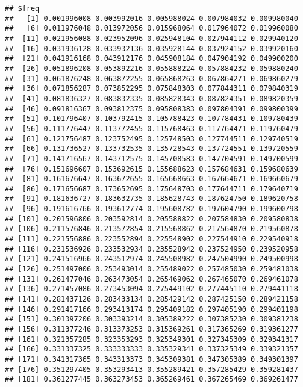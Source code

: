 \documentclass[]{article}
\begin{document}
\begin{verbatim}
## $freq
##   [1] 0.001996008 0.003992016 0.005988024 0.007984032 0.009980040
##   [6] 0.011976048 0.013972056 0.015968064 0.017964072 0.019960080
##  [11] 0.021956088 0.023952096 0.025948104 0.027944112 0.029940120
##  [16] 0.031936128 0.033932136 0.035928144 0.037924152 0.039920160
##  [21] 0.041916168 0.043912176 0.045908184 0.047904192 0.049900200
##  [26] 0.051896208 0.053892216 0.055888224 0.057884232 0.059880240
##  [31] 0.061876248 0.063872255 0.065868263 0.067864271 0.069860279
##  [36] 0.071856287 0.073852295 0.075848303 0.077844311 0.079840319
##  [41] 0.081836327 0.083832335 0.085828343 0.087824351 0.089820359
##  [46] 0.091816367 0.093812375 0.095808383 0.097804391 0.099800399
##  [51] 0.101796407 0.103792415 0.105788423 0.107784431 0.109780439
##  [56] 0.111776447 0.113772455 0.115768463 0.117764471 0.119760479
##  [61] 0.121756487 0.123752495 0.125748503 0.127744511 0.129740519
##  [66] 0.131736527 0.133732535 0.135728543 0.137724551 0.139720559
##  [71] 0.141716567 0.143712575 0.145708583 0.147704591 0.149700599
##  [76] 0.151696607 0.153692615 0.155688623 0.157684631 0.159680639
##  [81] 0.161676647 0.163672655 0.165668663 0.167664671 0.169660679
##  [86] 0.171656687 0.173652695 0.175648703 0.177644711 0.179640719
##  [91] 0.181636727 0.183632735 0.185628743 0.187624750 0.189620758
##  [96] 0.191616766 0.193612774 0.195608782 0.197604790 0.199600798
## [101] 0.201596806 0.203592814 0.205588822 0.207584830 0.209580838
## [106] 0.211576846 0.213572854 0.215568862 0.217564870 0.219560878
## [111] 0.221556886 0.223552894 0.225548902 0.227544910 0.229540918
## [116] 0.231536926 0.233532934 0.235528942 0.237524950 0.239520958
## [121] 0.241516966 0.243512974 0.245508982 0.247504990 0.249500998
## [126] 0.251497006 0.253493014 0.255489022 0.257485030 0.259481038
## [131] 0.261477046 0.263473054 0.265469062 0.267465070 0.269461078
## [136] 0.271457086 0.273453094 0.275449102 0.277445110 0.279441118
## [141] 0.281437126 0.283433134 0.285429142 0.287425150 0.289421158
## [146] 0.291417166 0.293413174 0.295409182 0.297405190 0.299401198
## [151] 0.301397206 0.303393214 0.305389222 0.307385230 0.309381238
## [156] 0.311377246 0.313373253 0.315369261 0.317365269 0.319361277
## [161] 0.321357285 0.323353293 0.325349301 0.327345309 0.329341317
## [166] 0.331337325 0.333333333 0.335329341 0.337325349 0.339321357
## [171] 0.341317365 0.343313373 0.345309381 0.347305389 0.349301397
## [176] 0.351297405 0.353293413 0.355289421 0.357285429 0.359281437
## [181] 0.361277445 0.363273453 0.365269461 0.367265469 0.369261477

\end{verbatim}
\end{document}
